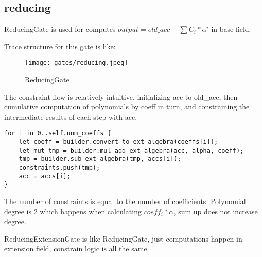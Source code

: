 \subsection{reducing}

ReducingGate is used for computes $output = old\_acc + \sum C_i*\alpha^i$ in base field.

Trace structure for this gate is like:

\begin{figure}[!ht]
    \centering
    \texttt{[image: gates/reducing.jpeg]}
    \caption{ReducingGate}
    \label{fig:reducing}
\end{figure}

The constraint flow is relatively intuitive, initializing acc to old\_acc, then cumulative computation of polynomials by coeff in turn, 
and constraining the intermediate results of each step with acc.

\begin{lstlisting}
for i in 0..self.num_coeffs {
    let coeff = builder.convert_to_ext_algebra(coeffs[i]);
    let mut tmp = builder.mul_add_ext_algebra(acc, alpha, coeff);
    tmp = builder.sub_ext_algebra(tmp, accs[i]);
    constraints.push(tmp);
    acc = accs[i];
}
\end{lstlisting}

The number of constraints is equal to the number of coefficients. Polynomial degree is 2 which happens when calculating $coeff_i * \alpha$, sum up does not increase degree.

ReducingExtensionGate is like ReducingGate, just computations happen in extension field, constrain logic is all the same.